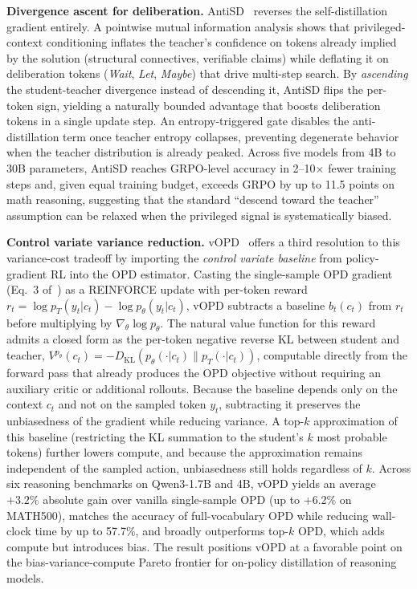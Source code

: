 \documentclass{article} %
\newcommand{\KL}{D_{\mathrm{KL}}}
\newcommand{\ptheta}{p_\theta}
\newcommand{\pteacher}{p_T}
\begin{document}
\textbf{Divergence ascent for deliberation.} AntiSD~\citep{2605.11609} reverses the self-distillation gradient entirely. A pointwise mutual information analysis shows that privileged-context conditioning inflates the teacher's confidence on tokens already implied by the solution (structural connectives, verifiable claims) while deflating it on deliberation tokens (\textit{Wait}, \textit{Let}, \textit{Maybe}) that drive multi-step search. By \emph{ascending} the student-teacher divergence instead of descending it, AntiSD flips the per-token sign, yielding a naturally bounded advantage that boosts deliberation tokens in a single update step. An entropy-triggered gate disables the anti-distillation term once teacher entropy collapses, preventing degenerate behavior when the teacher distribution is already peaked. Across five models from 4B to 30B parameters, AntiSD reaches GRPO-level accuracy in 2--10$\times$ fewer training steps and, given equal training budget, exceeds GRPO by up to 11.5 points on math reasoning, suggesting that the standard ``descend toward the teacher'' assumption can be relaxed when the privileged signal is systematically biased.

\textbf{Control variate variance reduction.} vOPD~\citep{2605.07865} offers a third resolution to this variance-cost tradeoff by importing the \emph{control variate baseline} from policy-gradient RL into the OPD estimator. Casting the single-sample OPD gradient (Eq.~3 of~\citealp{2605.07865}) as a REINFORCE update with per-token reward $r_t = \log \pteacher(y_t|c_t) - \log \ptheta(y_t|c_t)$, vOPD subtracts a baseline $b_t(c_t)$ from $r_t$ before multiplying by $\nabla_\theta \log \ptheta$. The natural value function for this reward admits a closed form as the per-token negative reverse KL between student and teacher, $V^{\ptheta}(c_t) = -\KL(\ptheta(\cdot|c_t) \parallel \pteacher(\cdot|c_t))$, computable directly from the forward pass that already produces the OPD objective without requiring an auxiliary critic or additional rollouts. Because the baseline depends only on the context $c_t$ and not on the sampled token $y_t$, subtracting it preserves the unbiasedness of the gradient while reducing variance. A top-$k$ approximation of this baseline (restricting the KL summation to the student's $k$ most probable tokens) further lowers compute, and because the approximation remains independent of the sampled action, unbiasedness still holds regardless of $k$. Across six reasoning benchmarks on Qwen3-1.7B and 4B, vOPD yields an average $+3.2\%$ absolute gain over vanilla single-sample OPD (up to +6.2\% on MATH500), matches the accuracy of full-vocabulary OPD while reducing wall-clock time by up to 57.7\%, and broadly outperforms top-$k$ OPD, which adds compute but introduces bias. The result positions vOPD at a favorable point on the bias-variance-compute Pareto frontier for on-policy distillation of reasoning models.
\end{document}
